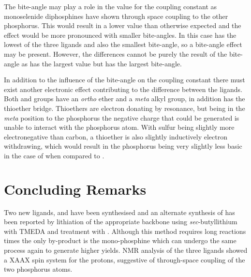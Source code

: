 The bite-angle may play a role in the value for the \JPSe{} coupling constant as monoselenide diphosphines have shown through space coupling to the other phosphorus.\cite{Hierso2014}  This would result in a lower \JPSe{} value than otherwise expected and the effect would be more pronounced with smaller bite-angles.  In this case \tBusixantphos{} has the lowest \pKb{} of the three ligands and also the smallest bite-angle, so a bite-angle effect may be present.  However, the differences cannot be purely the result of the bite-angle as \tButhixantphos{} has the largest \JPSe{} value but \tBuxantphos{} has the largest bite-angle.

In addition to the influence of the bite-angle on the \JPSe{} coupling constant there must exist another electronic effect contributing to the difference between the ligands.  Both \tButhixantphos{} and \tBuxantphos{} groups have an \emph{ortho} ether and a \emph{meta} alkyl group, in addition \tButhixantphos{} has the thioether bridge.  Thioethers are electron donating by resonance, but being in the \emph{meta} position to the phosphorus the negative charge that could be generated is unable to interact with the phosphorus atom.  With sulfur being slightly more electronegative than carbon, a thioether is also slightly inductively electron withdrawing, which would result in the phosphorus being very slightly less basic in the case of \tButhixantphos{} when compared to \tBuxantphos{}.

\section{Concluding Remarks}

Two new \tBuxantphos{} ligands, \tBusixantphos{} and \tBuxantphos{} have been synthesised and an alternate synthesis of \tBuxantphos{} has been reported by lithiation of the appropriate backbone using \emph{sec}-butyllithium with \gls{TMEDA} and treatment with .  Although this method requires long reactions times the only by-product is the mono-phosphine which can undergo the same process again to generate higher yields.  NMR analysis of the three ligands showed a XAA\textprime{}X\textprime{} spin system for the \tBu{} protons, suggestive of through-space coupling of the two phosphorus atoms.

